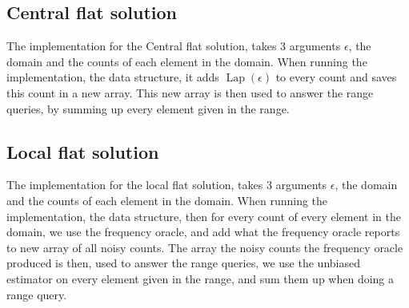 \documentclass[11pt]{article}
\theoremstyle{definition}
\begin{document}
\subsection{Central flat solution}
The implementation for the Central flat solution, takes 3 arguments $\epsilon$, the domain and the counts of each element in the domain. 
When running the implementation, the data structure, it adds $\operatorname{Lap}(\epsilon)$ to every count and saves this count in a new array. This new array is then used to answer the range queries, by summing up every element given in the range.

\subsection{Local flat solution}
The implementation for the local flat solution, takes 3 arguments $\epsilon$, the domain and the counts of each element in the domain. 
When running the implementation, the data structure, then for every count of every element in the domain, we use the frequency oracle, and add what the frequency oracle reports to new array of all noisy counts.  The array the noisy counts the frequency oracle produced is then, used to answer the range queries, we use the unbiased estimator on every element given in the range, and sum them up when doing a range query. 
\end{document}
